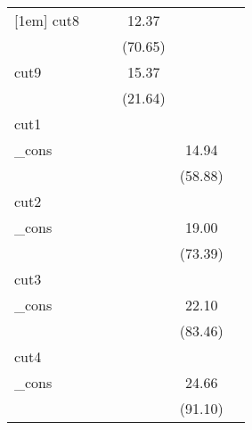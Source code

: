 {\begin{tabular}{l*{5}{c}}
[1em]
cut8        &                     &                     &       12.37\sym{***}&                     &                     \\
            &                     &                     &     (70.65)         &                     &                     \\
[1em]
cut9        &                     &                     &       15.37\sym{***}&                     &                     \\
            &                     &                     &     (21.64)         &                     &                     \\
\hline
cut1        &                     &                     &                     &                     &                     \\
\_cons      &                     &                     &                     &       14.94\sym{***}&                     \\
            &                     &                     &                     &     (58.88)         &                     \\
\hline
cut2        &                     &                     &                     &                     &                     \\
\_cons      &                     &                     &                     &       19.00\sym{***}&                     \\
            &                     &                     &                     &     (73.39)         &                     \\
\hline
cut3        &                     &                     &                     &                     &                     \\
\_cons      &                     &                     &                     &       22.10\sym{***}&                     \\
            &                     &                     &                     &     (83.46)         &                     \\
\hline
cut4        &                     &                     &                     &                     &                     \\
\_cons      &                     &                     &                     &       24.66\sym{***}&                     \\
            &                     &                     &                     &     (91.10)         &                     \\

\end{tabular}}
